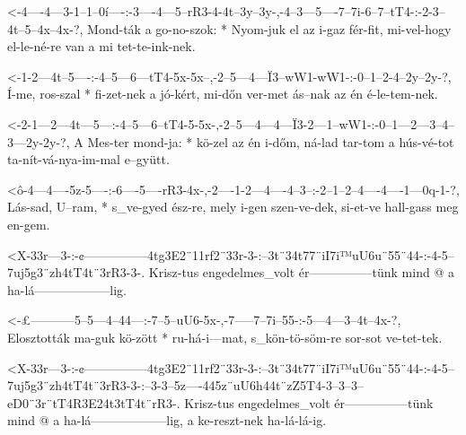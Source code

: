 
  {<-4----4---3-1--1--0í----:-3----4---5--rR3-4-4t--3y--3y-,-4--3---5----7--7i-6--7--tT4-:-2-3--4t--5--4x--4x-?,}
  {  Mond-ták a go-no-szok: * Nyom-juk el az  i-gaz fér-fit, mi-vel-hogy el-le-né-re van   a mi tet-te-ink-nek.}

  {<-1-2---4t--5----:-4--5---6---tT4-5x-5x--,-2--5---4---Ï3--wW1-wW1-:-0--1--2-4--2y--2y-?,}
  {  Í-me, ros-szal * fi-zet-nek a   jó-kért, mi-dőn ver-met ás--nak   az én é-le-tem-nek.}

  {<-2-1---2---4t---5---:-4--5---6--tT4-5-5x-,-2--5---4---4---Ï3-2---1--wW1-:-0--1---2--–3--4--3---2y-2y-?,}
  {  A Mes-ter mond-ja: * kö-zel az én  i-dőm, ná-lad tar-tom a  hús-vé-tot   ta-nít-vá-nya-im-mal e--gyütt.}



  {<ô-4---4----5z-5----:-6----5----rR3-4x-,-2----1-2---4----4--3--:-2--1--2--4----4----1---0q-1-?,}
  {   Lás-sad, U--ram, * s_ve-gyed ész-re,  mely i-gen szen-ve-dek, si-et-ve hall-gass meg en-gem.}




  {<X-33r---3-:-¢---------------4tg3E2¨11rf2¨33r-3-:--3t¨34t77¨iI7i™uU6u¨55¨44-:-4-5--7uj5g3¨zh4tT4t¨3rR3-3-.}
  {   Krisz-tus engedelmes_volt ér---------------tünk mind          @            a ha-lá------------------lig.}



  {<-£-----------5--5---4--44---:-7--5--uU6-5x-,-7-----7--7i--55-:-5---4---3--4t--4x-?,}
  {  Elosztották ma-guk kö-zött * ru-há-i---mat, s_kön-tö-söm-re   sor-sot ve-tet-tek.}


  {<X-33r---3-:-¢---------------4tg3E2¨11rf2¨33r-3-:--3t¨34t77¨iI7i™uU6u¨55¨44-:-4-5--7uj5g3¨zh4tT4t¨3rR3-3-:--3-3--5z----445z¨uU6h44t¨zZ5T4-3--3--3--eD0¨3r¨tT4R3E24t3tT4t¨rR3-.}
  {   Krisz-tus engedelmes_volt ér---------------tünk mind          @            a ha-lá------------------lig, a ke-reszt-nek                ha-lá-lá-ig.}

